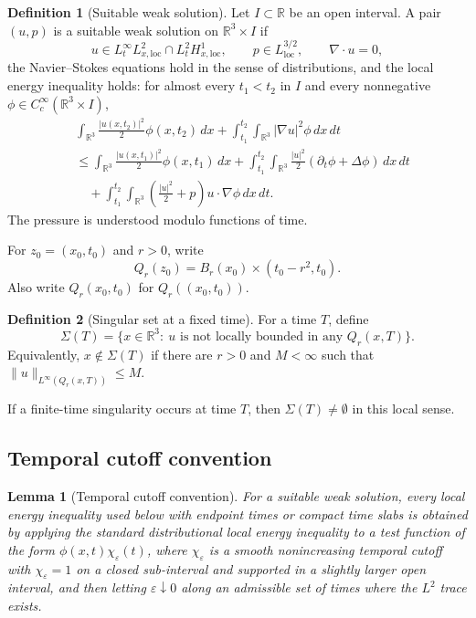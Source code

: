 \documentclass[11pt]{amsart}
\theoremstyle{plain}
\newtheorem{lemma}[lemma]{Lemma}
\theoremstyle{definition}
\newtheorem{definition}[definition]{Definition}
\theoremstyle{remark}
\numberwithin{equation}{section}
\begin{document}
\begin{definition}[Suitable weak solution]
Let \(I\subset\mathbb R\) be an open interval.  A pair \((u,p)\) is a suitable
weak solution on \(\mathbb R^3\times I\) if
\[
  u\in L^\infty_tL^2_{x,\mathrm{loc}}
  \cap L^2_tH^1_{x,\mathrm{loc}},
  \qquad
  p\in L^{3/2}_{\mathrm{loc}},
  \qquad
  \nabla\cdot u=0,
\]
the Navier--Stokes equations hold in the sense of distributions, and the local
energy inequality holds: for almost every \(t_1<t_2\) in \(I\) and every
nonnegative \(\phi\in C_c^\infty(\mathbb R^3\times I)\),
\[
\begin{aligned}
&\int_{\mathbb R^3}\frac{|u(x,t_2)|^2}{2}\phi(x,t_2)\,dx
 +\int_{t_1}^{t_2}\int_{\mathbb R^3}|\nabla u|^2\phi\,dx\,dt \\
&\le
 \int_{\mathbb R^3}\frac{|u(x,t_1)|^2}{2}\phi(x,t_1)\,dx
 +\int_{t_1}^{t_2}\int_{\mathbb R^3}
   \frac{|u|^2}{2}(\partial_t\phi+\Delta\phi)\,dx\,dt \\
&\quad
 +\int_{t_1}^{t_2}\int_{\mathbb R^3}
   \left(\frac{|u|^2}{2}+p\right)u\cdot\nabla\phi\,dx\,dt .
\end{aligned}
\]
The pressure is understood modulo functions of time.
\end{definition}

For \(z_0=(x_0,t_0)\) and \(r>0\), write
\[
  Q_r(z_0)=B_r(x_0)\times(t_0-r^2,t_0).
\]
Also write \(Q_r(x_0,t_0)\) for \(Q_r((x_0,t_0))\).

\begin{definition}[Singular set at a fixed time]
For a time \(T\), define
\[
  \Sigma(T)=
  \{x\in\mathbb R^3:\ u\text{ is not locally bounded in any }
  Q_r(x,T)\}.
\]
Equivalently, \(x\notin\Sigma(T)\) if there are \(r>0\) and \(M<\infty\) such
that \(\|u\|_{L^\infty(Q_r(x,T))}\le M\).
\end{definition}

If a finite-time singularity occurs at time \(T\), then
\(\Sigma(T)\ne\emptyset\) in this local sense.

\subsection*{Temporal cutoff convention}

\begin{lemma}[Temporal cutoff convention]\label{p0:lem:temporal-cutoff}
For a suitable weak solution, every local energy inequality used below with
endpoint times or compact time slabs is obtained by applying the standard
distributional local energy inequality to a test function of the form
\(\phi(x,t)\chi_\varepsilon(t)\), where \(\chi_\varepsilon\) is a smooth
nonincreasing temporal cutoff with \(\chi_\varepsilon=1\) on a closed
sub-interval and supported in a slightly larger open interval, and then
letting \(\varepsilon\downarrow0\) along an admissible set of times where the
\(L^2\) trace exists.
\end{lemma}
\end{document}

